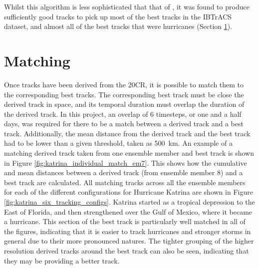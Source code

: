 \documentclass[pdftex,12pt,a4paper]{report}
\begin{document}
Whilst this algorithm is less sophisticated that that of \textcite{hodges1994general}, it was found
to produce sufficiently good tracks to pick up most of the best tracks in the IBTrACS dataset, and
almost all of the best tracks that were hurricanes (Section \ref{sec:matching}). 


\section{Matching}
\label{sec:matching}

Once tracks have been derived from the 20CR, it is possible to match them to the corresponding best
tracks. The corresponding best track must be close the derived track in space, and its temporal
duration must overlap the duration of the derived track. In this project, an overlap of 6 timesteps,
or one and a half days, was required for there to be a match between a derived track and a best
track. Additionally, the mean distance from the derived track and the best track had to be lower
than a given threshold, taken as \SI{500}{km}. An example of a matching derived track taken from
one ensemble member and best track is shown in Figure \ref{fig:katrina_individual_match_em7}.
This shows how the cumulative and mean distances between a derived track (from ensemble member 8)
and a best track are calculated. All matching tracks across all the ensemble members for each of the
different configurations for Hurricane Katrina are shown in Figure
\ref{fig:katrina_six_tracking_configs}. Katrina started as a tropical depression to the East of
Florida, and then strengthened over the Gulf of Mexico, where it became a hurricane. This section of
the best track is particularly well matched in all of the figures, indicating that it is easier to
track hurricanes and stronger storms in general due to their more pronounced natures. The tighter
grouping of the higher resolution derived tracks around the best track can also be seen, indicating
that they may be providing a better track. 
\end{document}
